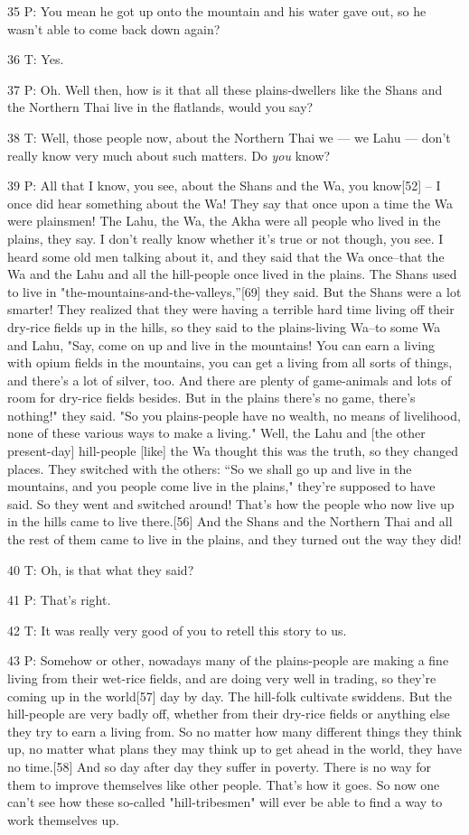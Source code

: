{35 P: You mean he got up onto the mountain and his water gave out, so he
wasn't able to come back down again?}

{36 T: Yes.}

{37 P: Oh. Well then, how is it that all these plains-dwellers like the
Shans and the Northern Thai live in the flatlands, would you say?}

{38 T: Well, those people now, about the Northern Thai we --- we Lahu ---
don't really know very much about such matters. Do }{\textit{you}}{
know? }

{39 P: All that I know, you see, about the Shans and the Wa, you know[52]
-- I once did hear something about the Wa! They say that once upon a time the Wa
were plainsmen! The Lahu, the Wa, the Akha were all people who lived in the plains,
they say. I don't really know whether it's true or not though, you see. I heard
some old men talking about it, and they said that the Wa once--that the Wa and
the Lahu and all the hill-people once lived in the plains. The Shans used to live
in "the-mountains-and-the-valleys,''[69] they said. But the Shans were
a lot smarter! They realized that they were having a terrible hard time living
off their dry-rice fields up in the hills, so they said to the plains-living Wa--to
some Wa and Lahu, "Say, come on up and live in the mountains! You can
earn a living with opium fields in the mountains, you can get a living from all
sorts of things, and there's a lot of silver, too. And there are plenty of game-animals
and lots of room for dry-rice fields besides. But in the plains there's no game,
there's nothing!" they said. "So you plains-people have no wealth,
no means of livelihood, none of these various ways to make a living."
Well, the Lahu and [the other present-day] hill-people [like] the Wa thought this
was the truth, so they changed places. They switched with the others: ``So we shall
go up and live in the mountains, and you people come live in the plains,"
they're supposed to have said. So they went and switched around! That's how the
people who now live up in the hills came to live there.[56] And the Shans and the
Northern Thai and all the rest of them came to live in the plains, and they turned
out the way they did! }

{40 T: Oh, is that what they said?}

{41 P: That's right.}

{42 T: It was really very good of you to retell this story to us.}

{43 P: Somehow or other, nowadays many of the plains-people are making a
fine living from their wet-rice fields, and are doing very well in trading, so
they're coming up in the world[57] day by day. The hill-folk cultivate swiddens.
But the hill-people are very badly off, whether from their dry-rice fields or anything
else they try to earn a living from. So no matter how many different things they
think up, no matter what plans they may think up to get ahead in the world, they
have no time.[58] And so day after day they suffer in poverty. There is no way
for them to improve themselves like other people. That's how it goes. So now one
can't see how these so-called "hill-tribesmen" will ever be able
to find a way to work themselves up. }

